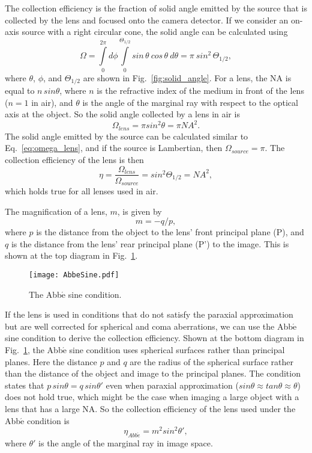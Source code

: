 The collection efficiency is the fraction of solid angle emitted by the source that is collected by the lens and focused onto the camera detector.  If we consider an on-axis source with a right circular cone, the solid angle can be calculated using
%
\begin{equation}
\label{eq:omega_lens}
\Omega = \int\limits_0^{2\pi} d \phi 
				\int\limits_0^{\Theta_{1/2}} sin \, \theta \ cos\, \theta \ d\theta = \pi \ sin^2 \, \Theta_{1/2},
\end{equation}
%
where $\theta$, $\phi$, and $\Theta_{1/2}$ are shown in Fig.~\ref{fig:solid_angle}.  For a lens, the NA is equal to $n \, sin \theta$, where $n$ is the refractive index of the medium in front of the lens ($n = 1$ in air), and $\theta$ is the angle of the marginal ray with respect to the optical axis at the object.  So the solid angle collected by a lens in air is
%
\begin{equation}
\Omega_{lens} = \pi sin^2 \theta = \pi NA^2.
\end{equation}
%
The solid angle emitted by the source can be calculated similar to Eq.~\ref{eq:omega_lens}, and if the source is Lambertian, then $\Omega_{source} =  \pi$.  The collection efficiency of the lens is then
%
\begin{equation}
\label{eq:lens_collection_efficiency_all}
\eta = \frac{\Omega_{lens}}{\Omega_{source}} = sin^2 \Theta_{1/2} = NA^2,
\end{equation}
%
which holds true for all lenses used in air.

The magnification of a lens, $m$, is given by
%
\begin{equation}
m = -q/p,
\label{eqn:magnification}
\end{equation}
%
where $p$ is the distance from the object to the lens' front principal plane (P), and $q$ is the distance from the lens' rear principal plane (P') to the image.  This is shown at the top diagram in Fig.~\ref{fig:Abbe}.
%
\begin{figure}[h]
\texttt{[image: AbbeSine.pdf]}
\caption{The Abb$\acute{\mathrm{e}}$ sine condition.}
\label{fig:Abbe}
\end{figure}
%
If the lens is used in conditions that do not satisfy the paraxial approximation but are well corrected for spherical and coma aberrations, we can use the Abb$\acute{\mathrm{e}}$ sine condition to derive the collection efficiency.  Shown at the bottom diagram in Fig.~\ref{fig:Abbe}, the Abb$\acute{\mathrm{e}}$ sine condition uses spherical surfaces rather than principal planes.  Here the distance $p$ and $q$ are the radius of the spherical surface rather than the distance of the object and image to the principal planes.  The condition states that $p \, sin \theta = q \, sin \theta'$ even when paraxial approximation ($sin \theta \approx tan \theta \approx \theta $) does not hold true, which might be the case when imaging a large object with a lens that has a large NA.  So the collection efficiency of the lens used under the Abb$\acute{\mathrm{e}}$ condition is
%
\begin{equation}
	\eta_{Abb\acute{e}} = m^2 sin^2 \theta',
\end{equation}
%
where $\theta'$ is the angle of the marginal ray in image space.

